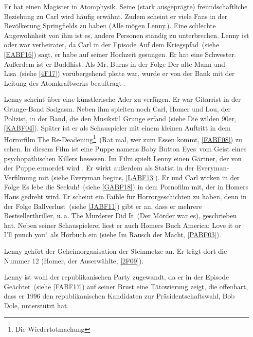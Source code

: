 Er hat einen Magister in Atomphysik. Seine (stark ausgeprägte) freundschaftliche Beziehung zu Carl wird häufig erwähnt. Zudem scheint er viele Fans in der Bevölkerung Springfields zu haben (\glqq Alle mögen Lenny.\grqq ). Eine schlechte Angewohnheit von ihm ist es, andere Personen ständig zu unterbrechen. Lenny ist oder war verheiratet, da Carl in der Episode \glqq Auf dem Kriegspfad\grqq\ (siehe \ref{EABF16}) sagt, er habe auf seiner Hochzeit gesungen. Er hat eine Schwester. Außerdem ist er Buddhist. Als Mr. Burns in der Folge \glqq Der alte Mann und Lisa\grqq\ (siehe \ref{4F17}) vorübergehend pleite war, wurde er von der Bank mit der Leitung des Atomkraftwerks beauftragt \cite{SpringfieldAt}.

Lenny scheint über eine künstlerische Ader zu verfügen. Er war Gitarrist in der Grunge-Band \glqq Sadgasm\grqq . Neben ihm spielten noch Carl, Homer und Lou, der Polizist, in der Band, die den Musikstil Grunge erfand (siehe \glqq Die wilden 90er\grqq , \ref{KABF04}). Später ist er als Schauspieler mit einem kleinen Auftritt in dem Horrorfilm \glqq The Re-Deaden\-ing\footnote{Die Wiedertotmachung}\grqq\ (\glqq Rat mal, wer zum Essen kommt\grqq , \ref{FABF08}) zu sehen. In diesem Film ist eine Puppe namens \glqq Baby Button Eyes\grqq\ vom Geist eines psychopathischen Killers besessen. Im Film spielt Lenny einen Gärtner, der von der Puppe ermordet wird \cite{WikiEnLenny}. Er wirkt außerdem als Statist in der Everyman-Verfilmung mit (siehe \glqq Everyman begins\grqq, \ref{LABF13}). Er und Carl wirken in der Folge \glqq Es lebe die Seekuh!\grqq\ (siehe \ref{GABF18}) in dem Pornofilm mit, der in Homers Haus gedreht wird. Er scheint ein Faible für Horrorgeschichten zu haben, denn in der Folge \glqq Ballverlust\grqq\ (siehe \ref{JABF11}) gibt er an, dass er mehrere Bestsellerthriller, u.\,a. \glqq The Murderer Did It\grqq\ (Der Mörder war es), geschrieben hat. Neben seiner Schauspielerei liest er auch Homers Buch \glqq America: Love it or I'll punch you!\grqq\ als Hörbuch ein (siehe \glqq Im Rausch der Macht\grqq , \ref{PABF03}).

Lenny gehört der Geheimorganisation der Steinmetze an. Er trägt dort die Nummer 12 (\glqq Homer, der Auserwählte\grqq, \ref{2F09}).

Lenny ist wohl der republikanischen Party zugewandt, da er in der Episode \glqq Geächtet\grqq\ (siehe \ref{FABF17}) auf seiner Brust eine Tätowierung zeigt, die offenbart, dass er 1996 den republikanischen Kandidaten zur Präsidentschaftswahl, Bob Dole, unterstützt hat.


